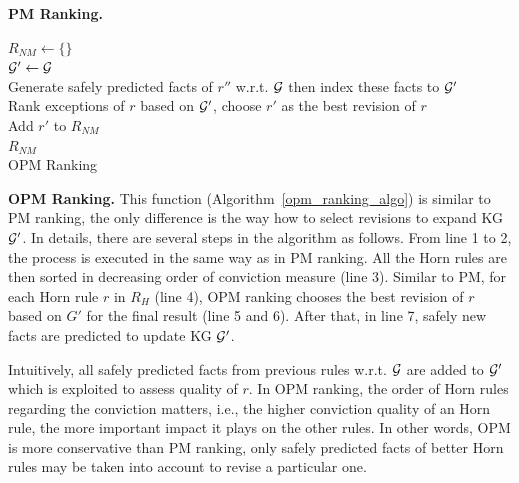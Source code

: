 \textbf{PM Ranking.} 

\IncMargin{1.5em}
\begin{algorithm}[H]
\DontPrintSemicolon
\SetAlgoLined
{}
\BlankLine
$R_{NM} \leftarrow \{\}$\\
\BlankLine
{} {
	$\mathcal{G}' \leftarrow \mathcal{G}$\\
	 {
		Generate safely predicted facts of $r''$ w.r.t. $\mathcal{G}$ then index these facts to $\mathcal{G}'$\\
	}
	Rank exceptions of $r$ based on $\mathcal{G}'$, choose $r'$ as the best revision of $r$\\
	Add $r'$ to $R_{NM}$\\
}
\Return $R_{NM}$\\
\caption{OPM Ranking}
\label{bf_pm_ranking_algo}
\end{algorithm}
\DecMargin{1.5em}

\textbf{OPM Ranking.} This function (Algorithm~\ref{opm_ranking_algo}) is similar to PM ranking, the only difference is the way how to select revisions to expand KG $\mathcal{G}'$. In details, there are several steps in the algorithm as follows. From line 1 to 2, the process is executed in the same way as in PM ranking. All the Horn rules are then sorted in decreasing order of conviction measure (line 3). Similar to PM, for each Horn rule $r$ in $R_H$ (line 4), OPM ranking chooses the best revision of $r$ based on $G'$ for the final result (line 5 and 6). After that, in line 7, safely new facts are predicted to update KG $\mathcal{G}'$.

Intuitively, all safely predicted facts from previous rules w.r.t. $\mathcal{G}$ are added to $\mathcal{G}'$ which is exploited to assess quality of $r$. In OPM ranking, the order of Horn rules regarding the conviction matters, i.e., the higher conviction quality of an Horn rule, the more important impact it plays on the other rules. In other words, OPM is more conservative than PM ranking, only safely predicted facts of better Horn rules may be taken into account to revise a particular one.

